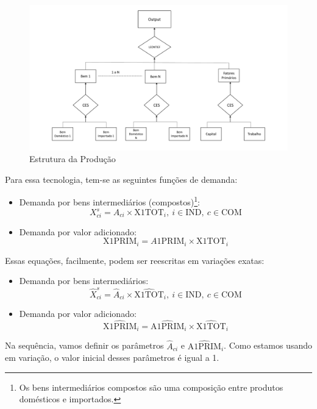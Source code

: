 \documentclass[12pt,twoside]{article}
\let\rmarkdownfootnote\footnote%
\def\footnote{\protect\rmarkdownfootnote}
\begin{document}
\begin{figure}
\centering
\includegraphics{producao.pdf}
\caption{Estrutura da Produção\label{producao1}}
\end{figure}

Para essa tecnologia, tem-se as seguintes funções de demanda:

\begin{itemize}
\item
  Demanda por bens intermediários (compostos)\footnote{Os bens
    intermediários compostos são uma composição entre produtos
    domésticos e importados.}:
  \[X^s_{ci} = A_{ci} \times \text{X1TOT}_i, ~i \in \text{IND},~c \in \text{COM}\]
\item
  Demanda por valor adicionado:
  \[\text{X1PRIM}_i = A\text{1PRIM}_{i}\times \text{X1TOT}_i\]
\end{itemize}

Essas equações, facilmente, podem ser reescritas em variações exatas:

\begin{itemize}
\item
  Demanda por bens intermediários:
  \[\hat{X}^s_{ci} = \hat{A}_{ci}\times \hat{\text{X1TOT}}_i, ~i \in \text{IND},~c \in \text{COM}\]
\item
  Demanda por valor adicionado:
  \[\hat{\text{X1PRIM}}_i = \hat{\text{A1PRIM}}_i \times \hat{\text{X1TOT}}_i\]
\end{itemize}

Na sequência, vamos definir os parâmetros \(\hat{A}_{ci}\) e
\(\hat{\text{A1PRIM}}_i\). Como estamos usando em variação, o valor
inicial desses parâmetros é igual a 1.
\end{document}
